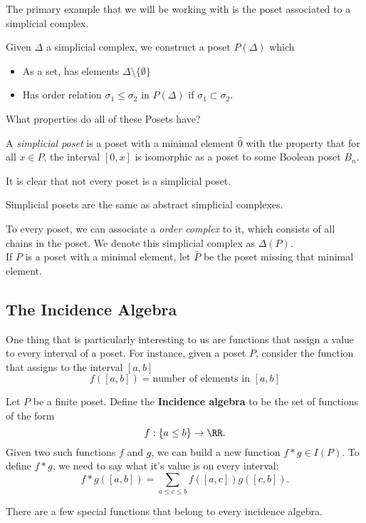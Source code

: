 The primary example that we will be working with is the poset associated to a simplicial complex.
\begin{definition}
 Given $\Delta$ a simplicial complex, we construct a poset $P(\Delta)$ which
 \begin{itemize}
 \item As a set, has elements $\Delta\setminus\{\emptyset\}$
 \item Has order relation  $\sigma_1\leq \sigma_2$ in $P(\Delta)$ if $\sigma_1\subset \sigma_2$. 
 \end{itemize}
\end{definition}

What properties do all of these Posets have?
\begin{definition}
 A \emph{simplicial poset} is a poset with a minimal element $\hat 0$ with the property that for all $x\in P$, the interval $[0, x]$ is isomorphic as a poset to some Boolean poset $B_n$. 
\end{definition}
It is clear that not every poset is a simplicial poset.
\begin{claim}
Simplicial posets are the same as abstract simplicial complexes.
\end{claim}
To every poset, we can associate a \emph{order complex} to it, which consists of all chains in the poset. We denote this simplicial complex as $\Delta(P)$. \\ If $P$ is a poset with a minimal element, let $\bar P$ be the poset missing that minimal element. 



\subsection{The Incidence Algebra}
One thing that is particularly interesting to us are functions that assign a value to every interval of a poset. For instance,  given a poset $P$,  consider the function that assigns to the interval $[a, b]$
\[f([a, b])=\text{number of elements in }[a, b]\]
\begin{definition}
	Let $P$ be a finite poset. Define the \textbf{Incidence algebra} to be the set of functions of the form
	\[f:\{a\leq b\}\to \RR.\]
	Given two such functions $f$ and $g$, we can build a new function $f*g\in I(P)$. To define $f*g$,  we need to say what it's value is on every interval:
	\[f*g([a, b])=\sum_{a\leq c\leq b} f([a, c])g([c, b]).\]
\end{definition}
There are a few special functions that belong to every incidence algebra. 


